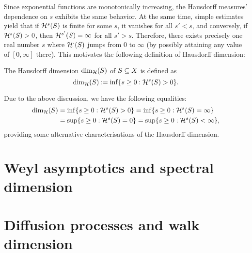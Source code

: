 Since exponential functions are monotonically increasing, the Hausdorff measures' dependence on $s$ exhibits the same behavior. At the same time, simple estimates yield that if $\mathcal{H}^s(S)$ is finite for some $s$, it vanishes for all $s'<s$, and conversely, if $\mathcal{H}^s(S)>0$, then $\mathcal{H}^{s'}(S)=\infty$ for all $s'>s$. Therefore, there exists precisely one real number $s$ where $\mathcal{H}^\cdot(S)$ jumps from $0$ to $\infty$ (by possibly attaining any value of $[0,\infty]$ there). This motivates the following definition of Hausdorff dimension:
\begin{defin}
  The Hausdorff dimension $\dim_{\mathcal{H}}(S)$ of $S\subseteq X$ is defined as
  \[
    \dim_{\mathcal{H}}(S):=\inf\{s\geq0:\mathcal{H}^s(S)>0\}.
  \]
\end{defin}
Due to the above discussion, we have the following equalities:
\begin{align*}
   \dim_{\mathcal{H}}(S)&=\inf\{s\geq0:\mathcal{H}^s(S)>0\}=\inf\{s\geq0:\mathcal{H}^s(S)=\infty\}\\
           &=\sup\{s\geq0:\mathcal{H}^s(S)=0\}=\sup\{s\geq0:\mathcal{H}^s(S)<\infty\},
\end{align*}
providing some alternative characterisations of the Hausdorff dimension.





\section{Weyl asymptotics and spectral dimension}

\section{Diffusion processes and walk dimension}

